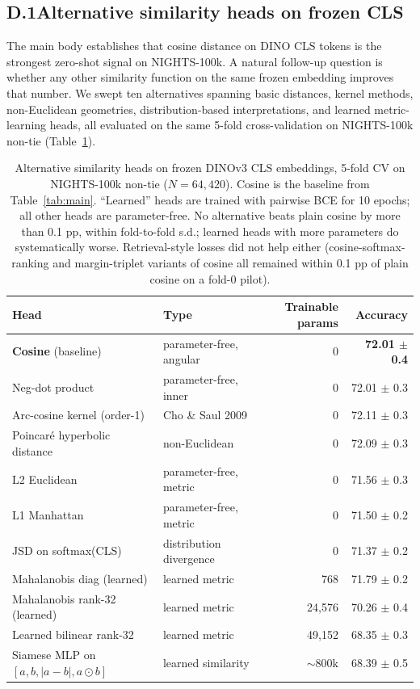 \subsection*{D.1\quad Alternative similarity heads on frozen CLS}

The main body establishes that cosine distance on DINO CLS tokens is the strongest zero-shot signal on NIGHTS-100k. A natural follow-up question is whether any other similarity function on the same frozen embedding improves that number. We swept ten alternatives spanning basic distances, kernel methods, non-Euclidean geometries, distribution-based interpretations, and learned metric-learning heads, all evaluated on the same 5-fold cross-validation on NIGHTS-100k non-tie (Table~\ref{tab:head-sweep}).

\begin{table}[!ht]
\caption{Alternative similarity heads on frozen DINOv3 CLS embeddings, 5-fold CV on NIGHTS-100k non-tie ($N=64{,}420$). Cosine is the baseline from Table~\ref{tab:main}. ``Learned'' heads are trained with pairwise BCE for 10 epochs; all other heads are parameter-free. No alternative beats plain cosine by more than 0.1 pp, within fold-to-fold s.d.; learned heads with more parameters do systematically worse. Retrieval-style losses did not help either (cosine-softmax-ranking and margin-triplet variants of cosine all remained within 0.1 pp of plain cosine on a fold-0 pilot).}
\label{tab:head-sweep}
\centering
\small
\begin{tabular}{llrr}
\toprule
Head & Type & Trainable params & Accuracy \\
\midrule
\textbf{Cosine} (baseline)                & parameter-free, angular & 0        & \textbf{72.01 $\pm$ 0.4} \\
Neg-dot product                           & parameter-free, inner   & 0        & 72.01 $\pm$ 0.3 \\
Arc-cosine kernel (order-1)               & Cho \& Saul 2009        & 0        & 72.11 $\pm$ 0.3 \\
Poincar\'e hyperbolic distance            & non-Euclidean           & 0        & 72.09 $\pm$ 0.3 \\
L2 Euclidean                              & parameter-free, metric  & 0        & 71.56 $\pm$ 0.3 \\
L1 Manhattan                              & parameter-free, metric  & 0        & 71.50 $\pm$ 0.2 \\
JSD on softmax(CLS)                       & distribution divergence & 0        & 71.37 $\pm$ 0.2 \\
\midrule
Mahalanobis diag (learned)                & learned metric          & 768      & 71.79 $\pm$ 0.2 \\
Mahalanobis rank-32 (learned)             & learned metric          & 24{,}576 & 70.26 $\pm$ 0.4 \\
Learned bilinear rank-32                  & learned metric          & 49{,}152 & 68.35 $\pm$ 0.3 \\
Siamese MLP on $[a, b, |a{-}b|, a{\odot}b]$ & learned similarity    & $\sim$800k & 68.39 $\pm$ 0.5 \\
\bottomrule
\end{tabular}
\end{table}

